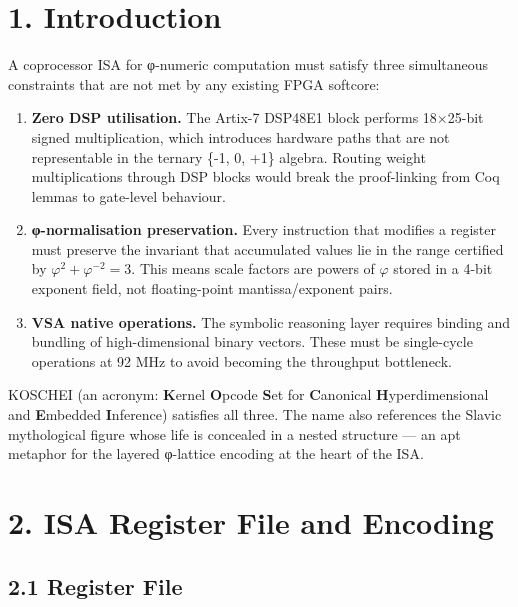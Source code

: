 \section{1. Introduction}\label{fa_26:introduction}

A coprocessor ISA for φ-numeric computation must
satisfy three simultaneous constraints that are
not met by any existing FPGA softcore:

\begin{enumerate}
\def\labelenumi{\arabic{enumi}.}
\item
  \textbf{Zero DSP utilisation.} The Artix-7
  DSP48E1 block performs 18$\times$25-bit signed
  multiplication, which introduces hardware paths
  that are not representable in the ternary \{-1,
  0, +1\} algebra. Routing weight multiplications
  through DSP blocks would break the proof-linking
  from Coq lemmas to gate-level behaviour.
\item
  \textbf{φ-normalisation preservation.} Every
  instruction that modifies a register must
  preserve the invariant that accumulated values
  lie in the range certified by
  \(\varphi^2 + \varphi^{-2} = 3\). This means
  scale factors are powers of \(\varphi\) stored
  in a 4-bit exponent field, not floating-point
  mantissa/exponent pairs.
\item
  \textbf{VSA native operations.} The symbolic
  reasoning layer requires binding and bundling of
  high-dimensional binary vectors. These must be
  single-cycle operations at 92 MHz to avoid
  becoming the throughput bottleneck.
\end{enumerate}

KOSCHEI (an acronym: \textbf{K}ernel
\textbf{O}pcode \textbf{S}et for
\textbf{C}anonical \textbf{H}yperdimensional and
\textbf{E}mbedded \textbf{I}nference) satisfies
all three. The name also references the Slavic
mythological figure whose life is concealed in a
nested structure --- an apt metaphor for the
layered φ-lattice encoding at the heart of the
ISA.

\section{2. ISA Register File and
Encoding}\label{fa_26:isa-register-file-and-encoding}

\subsection{2.1 Register
File}\label{fa_26:register-file}

